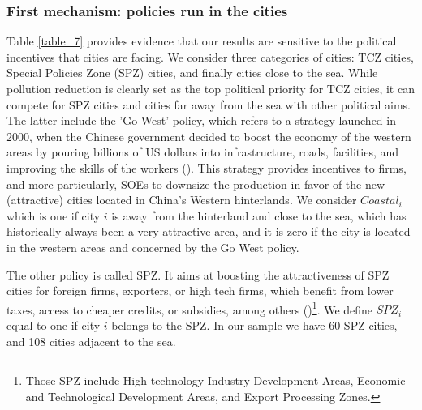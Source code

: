\documentclass[12pt]{article}
\begin{document}
\subsubsection{First mechanism: policies run in the cities}



Table \ref{table_7} provides evidence that our results are sensitive to the political incentives that cities are facing. We consider three categories of cities: TCZ cities, Special Policies Zone (SPZ) cities, and finally cities close to the sea. While pollution reduction is clearly set as the top political priority for TCZ cities, it can compete for SPZ cities and cities far away from the sea with other political aims. The latter include the 'Go West' policy, which refers to a strategy launched in 2000, when the Chinese government decided to boost the economy of the western areas by pouring billions of US dollars into infrastructure, roads, facilities, and improving the skills of the workers (\citealt{Chen2018-ki}). This strategy provides incentives to firms, and more particularly, SOEs to downsize the production in favor of the new (attractive) cities located in China's Western hinterlands. We consider $Coastal_i$ which is one if city $i$ is away from the hinterland and close to the sea, which has historically always been a very attractive area, and it is zero if the city is located in the western areas and concerned by the Go West policy. 


The other policy is called SPZ. It aims at boosting the attractiveness of SPZ cities for foreign firms, exporters, or high tech firms, which benefit from lower taxes, access to cheaper credits, or subsidies, among others (\citealt{Wang2008-gv,Hering2014-af})\footnote{ Those SPZ include High-technology Industry Development Areas, Economic and Technological Development Areas, and Export Processing Zones.}. We define $SPZ_i$ equal to one if city $i$ belongs to the SPZ. In our sample we have 60 SPZ cities, and 108 cities adjacent to the sea.
 
\end{document}
